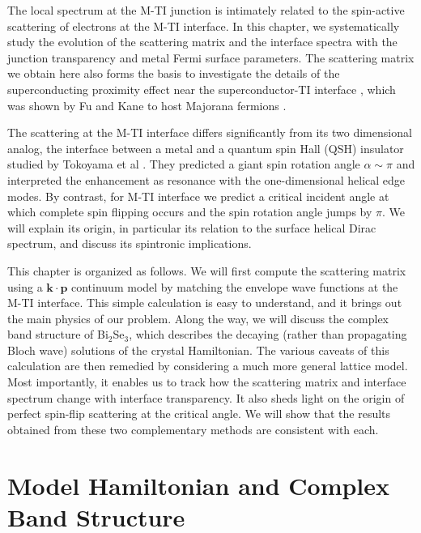 The local spectrum at the M-TI junction is intimately related to the spin-active scattering of electrons at the M-TI interface. In this chapter, we systematically study the evolution of the scattering matrix and the interface spectra
with the junction transparency and metal Fermi surface parameters. 
The scattering matrix \cite{mrs} we obtain here also forms the basis to investigate the details of the superconducting proximity effect near the superconductor-TI interface \cite{stan}, which was shown by Fu and Kane to host Majorana fermions \cite{majorana}.

The scattering at the M-TI interface differs significantly from its two dimensional analog, the interface between a metal and a quantum spin Hall (QSH) insulator studied by Tokoyama et al \cite{yokoyama09}. They predicted a giant spin rotation angle $\alpha\sim \pi$ and interpreted the enhancement as resonance with the one-dimensional helical edge modes. By contrast, for M-TI interface we predict a critical incident angle at which complete spin flipping occurs and the spin rotation angle jumps by $\pi$. We will explain its origin, {in particular its relation to the surface helical Dirac spectrum}, and discuss its spintronic implications.

This chapter is organized as follows. 
We will first compute the scattering matrix using a $\mathbf{k\cdot p}$ continuum model 
by matching the envelope wave functions at the M-TI interface. This simple calculation is easy to understand, 
and it brings out
the main physics of our problem. Along the way, we will discuss the complex band structure of Bi$_2$Se$_3$,
 which describes the decaying (rather than propagating Bloch wave) solutions of the crystal Hamiltonian.
The various caveats of this calculation 
are then remedied by considering a much more general lattice model. Most importantly, it enables us to 
track how the scattering matrix and interface spectrum change with interface transparency. It also sheds light on
the origin of perfect spin-flip scattering at the critical angle.
We will show that the results obtained from these two complementary methods are consistent with each.

\section{Model Hamiltonian and Complex Band Structure}

